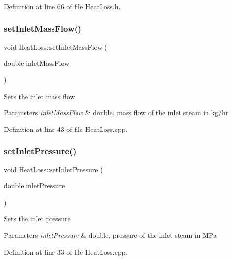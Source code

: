Definition at line 66 of file Heat\+Loss.\+h.

\mbox{\label{class_heat_loss_ac4154dc9922b6ddf3f2e7a10cc64c61f}} 
\subsubsection{\texorpdfstring{set\+Inlet\+Mass\+Flow()}{setInletMassFlow()}}
{\footnotesize\ttfamily void Heat\+Loss\+::set\+Inlet\+Mass\+Flow (\begin{DoxyParamCaption}\item[{double}]{inlet\+Mass\+Flow }\end{DoxyParamCaption})}

Sets the inlet mass flow 
\begin{DoxyParams}{Parameters}
{\em inlet\+Mass\+Flow} & double, mass flow of the inlet steam in kg/hr \\
\hline
\end{DoxyParams}


Definition at line 43 of file Heat\+Loss.\+cpp.

\mbox{\label{class_heat_loss_ab0a6b1f2a964d161d25758318f25f7e3}} 
\subsubsection{\texorpdfstring{set\+Inlet\+Pressure()}{setInletPressure()}}
{\footnotesize\ttfamily void Heat\+Loss\+::set\+Inlet\+Pressure (\begin{DoxyParamCaption}\item[{double}]{inlet\+Pressure }\end{DoxyParamCaption})}

Sets the inlet pressure 
\begin{DoxyParams}{Parameters}
{\em inlet\+Pressure} & double, pressure of the inlet steam in M\+Pa \\
\hline
\end{DoxyParams}


Definition at line 33 of file Heat\+Loss.\+cpp.

\mbox{\label{class_heat_loss_a2a4a80b16c1f975e194ae466b20d46bd}} 
